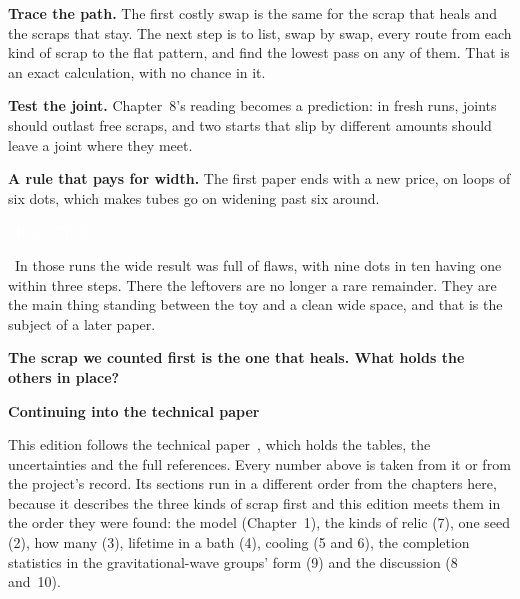 \documentclass[11pt,letterpaper]{article}
\newcommand{\sub}[1]{\par\medskip{\color{ink}\large\bfseries #1}\par}
\newcommand{\tagbox}[2]{{\sffamily\scriptsize\colorbox{#1}{\textcolor{white}{\strut #2}}}}
\newcommand{\Meas}{\tagbox{kMeas}{MEASURED}}
\begin{document}
\sub{What comes next}
\textbf{Trace the path.} The first costly swap is the same for the scrap that heals and the scraps
that stay. The next step is to list, swap by swap, every route from each kind of scrap to the flat
pattern, and find the lowest pass on any of them. That is an exact calculation, with no chance in
it.

\textbf{Test the joint.} Chapter~8's reading becomes a prediction: in fresh runs, joints should
outlast free scraps, and two starts that slip by different amounts should leave a joint where they
meet.

\textbf{A rule that pays for width.} The first paper ends with a new price, on loops of six dots,
which makes tubes go on widening past six around. \Meas\ In those runs the wide result was full of
flaws, with nine dots in ten having one within three steps. There the leftovers are no longer a rare
remainder. They are the main thing standing between the toy and a clean wide space, and that is the
subject of a later paper.

\begin{center}
{\color{ink}\Large\bfseries The scrap we counted first is the one that heals. What holds the others in place?}
\end{center}

\par{}\vspace{1.4em}
{\color{ink}\LARGE\bfseries Continuing into the technical paper}\par
\vspace{0.6em}

This edition follows the technical paper~\cite{tech}, which holds the tables, the uncertainties and
the full references. Every number above is taken from it or from the project's record. Its sections
run in a different order from the chapters here, because it describes the three kinds of scrap first
and this edition meets them in the order they were found: the model (Chapter~1), the kinds of relic
(7), one seed (2), how many (3), lifetime in a bath (4), cooling (5 and 6), the completion statistics
in the gravitational-wave groups' form (9) and the discussion (8 and~10).
\end{document}
